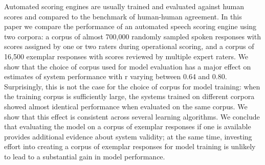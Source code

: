 Automated scoring engines are usually trained and evaluated against human scores and compared to the benchmark of human-human agreement. In this paper we compare the performance of an automated speech scoring engine using two corpora: a corpus of almost 700,000 randomly sampled spoken responses with scores assigned by one or two raters during operational scoring, and a corpus of 16,500 exemplar responses with scores reviewed by multiple expert raters. We show that the choice of corpus used for model evaluation has a major effect on estimates of system performance with r varying between 0.64 and 0.80. Surprisingly, this is not the case for the choice of corpus for model training: when the training corpus is sufficiently large, the systems trained on different corpora showed almost identical performance when evaluated on the same corpus. We show that this effect is consistent across several learning algorithms. We conclude that evaluating the model on a corpus of exemplar responses if one is available provides additional evidence about system validity; at the same time, investing effort into creating a corpus of exemplar responses for model training is unlikely to lead to a substantial gain in model performance.
